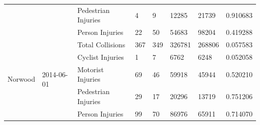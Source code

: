 \documentclass[10pt,journal,compsoc]{IEEEtran}
\begin{document}
\begin{table}[]
\begin{tabular}{|l|l|l|l|l|l|l|l|}
                                               &                             & Pedestrian Injuries & 4         & 9        & 12285      & 21739     & 0.910683 \\ \cline{3-8} 
                                               &                             & Person Injuries     & 22        & 50       & 54683      & 98204     & 0.419288 \\ \hline
\multirow{5}{*}{Norwood}                       & \multirow{5}{*}{2014-06-01} & Total Collisions    & 367       & 349      & 326781     & 268806    & 0.057583 \\ \cline{3-8} 
                                               &                             & Cyclist Injuries    & 1         & 7        & 6762       & 6248      & 0.052058 \\ \cline{3-8} 
                                               &                             & Motorist Injuries   & 69        & 46       & 59918      & 45944     & 0.520210 \\ \cline{3-8} 
                                               &                             & Pedestrian Injuries & 29        & 17       & 20296      & 13719     & 0.751206 \\ \cline{3-8} 
                                               &                             & Person Injuries     & 99        & 70       & 86976      & 65911     & 0.714070 \\ \hline
\end{tabular}
\end{table}
\end{document}
